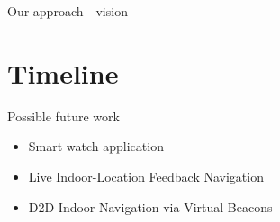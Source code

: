 \documentclass[11pt]{beamer}
\begin{document}
\begin{frame}{Our approach - vision}

    \begin{center}
    \end{center}

\end{frame}

\section{Timeline}

\begin{frame}{Possible future work}

	\begin{itemize}
        \item Smart watch application
        \item Live Indoor-Location Feedback Navigation
        \item D2D Indoor-Navigation via Virtual Beacons
    \end{itemize}

\end{frame}
\end{document}
